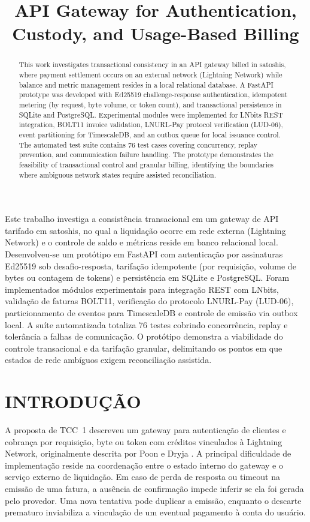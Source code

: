 \documentclass[openright]{normas-utf-tex}
\title{API Gateway for Authentication, Custody, and Usage-Based Billing}
\begin{document}
\capa
\folhaderosto
\sumario

\begin{resumo}
Este trabalho investiga a consistência transacional em um gateway de API tarifado em satoshis, no qual a liquidação ocorre em rede externa (Lightning Network) e o controle de saldo e métricas reside em banco relacional local. Desenvolveu-se um protótipo em FastAPI com autenticação por assinaturas Ed25519 sob desafio-resposta, tarifação idempotente (por requisição, volume de bytes ou contagem de tokens) e persistência em SQLite e PostgreSQL. Foram implementados módulos experimentais para integração REST com LNbits, validação de faturas BOLT11, verificação do protocolo LNURL-Pay (LUD-06), particionamento de eventos para TimescaleDB e controle de emissão via outbox local. A suíte automatizada totaliza 76 testes cobrindo concorrência, replay e tolerância a falhas de comunicação. O protótipo demonstra a viabilidade do controle transacional e da tarifação granular, delimitando os pontos em que estados de rede ambíguos exigem reconciliação assistida.
\end{resumo}

\begin{abstract}
This work investigates transactional consistency in an API gateway billed in satoshis, where payment settlement occurs on an external network (Lightning Network) while balance and metric management resides in a local relational database. A FastAPI prototype was developed with Ed25519 challenge-response authentication, idempotent metering (by request, byte volume, or token count), and transactional persistence in SQLite and PostgreSQL. Experimental modules were implemented for LNbits REST integration, BOLT11 invoice validation, LNURL-Pay protocol verification (LUD-06), event partitioning for TimescaleDB, and an outbox queue for local issuance control. The automated test suite contains 76 test cases covering concurrency, replay prevention, and communication failure handling. The prototype demonstrates the feasibility of transactional control and granular billing, identifying the boundaries where ambiguous network states require assisted reconciliation.
\end{abstract}

\chapter{INTRODUÇÃO}
A proposta de TCC~1 descreveu um gateway para autenticação de clientes e cobrança por requisição, byte ou token com créditos vinculados à Lightning Network, originalmente descrita por Poon e Dryja \cite{poon2016}. A principal dificuldade de implementação reside na coordenação entre o estado interno do gateway e o serviço externo de liquidação. Em caso de perda de resposta ou timeout na emissão de uma fatura, a ausência de confirmação impede inferir se ela foi gerada pelo provedor. Uma nova tentativa pode duplicar a emissão, enquanto o descarte prematuro inviabiliza a vinculação de um eventual pagamento à conta do usuário.
\end{document}
